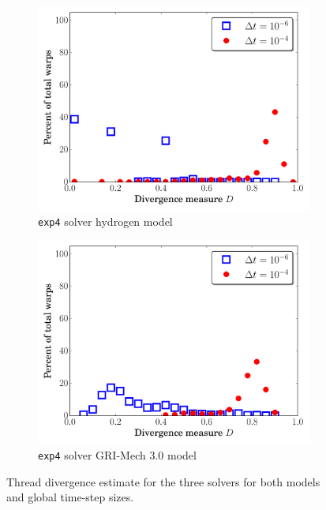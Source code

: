 \documentclass[preprint,review,11pt]{elsarticle}
\begin{document}
\begin{figure}[htbp]
\begin{subfigure}{0.49\textwidth}
      \includegraphics[width=\linewidth]{H2_exp4_div.pdf}
      \caption{\texttt{exp4} solver hydrogen model}
      \label{F:exp4_div_h2}
  \end{subfigure}
  \begin{subfigure}{0.49\textwidth}
      \includegraphics[width=\linewidth]{CH4_exp4_div.pdf}
      \caption{\texttt{exp4} solver GRI-Mech 3.0 model}
      \label{F:exp4_div_ch4}
  \end{subfigure}
  \caption{Thread divergence estimate for the three solvers for both models and global time-step sizes.}
  \label{F:divergence}
\end{figure}
\end{document}
